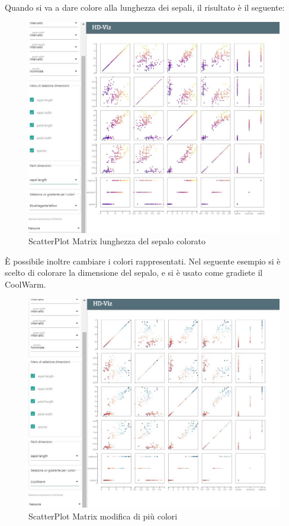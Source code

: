 \documentclass[../manuale_utente.tex]{subfiles}
\begin{document}
Quando si va a dare colore alla lunghezza dei sepali, il risultato è il seguente:

\begin{figure}[H]
	\centering
	\includegraphics[width=18cm]{img/spm/spm_colore_dimensione_sepal.jpg}
	\caption{ScatterPlot Matrix lunghezza del sepalo colorato}
\end{figure}

È possibile inoltre cambiare i colori rappresentati. Nel seguente esempio si è scelto di colorare la dimensione del sepalo, e si è usato come gradiete il CoolWarm.

\begin{figure}[H]
	\centering
	\includegraphics[width=18cm]{img/spm/spm_mix_colori.jpg}
	\caption{ScatterPlot Matrix modifica di più colori}
\end{figure}
\end{document}
